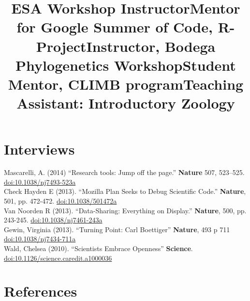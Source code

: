 \documentclass[margin]{res}
\begin{document}
\begin{resume}
\title{ESA Workshop Instructor}
\begin{position} \vspace{-.8cm} \end{position}
\title{Mentor for Google Summer of Code, R-Project}
\begin{position} \vspace{-.8cm} \end{position}
\title{Instructor, Bodega Phylogenetics Workshop}
\begin{position} \vspace{-.8cm} \end{position}
\title{Student Mentor, CLIMB program}
\begin{position} \vspace{-.8cm} \end{position}
\title{Teaching Assistant: Introductory Zoology}
 \begin{position} \vspace{-.0cm} \end{position}




\section{Interviews}

Mascarelli, A. (2014) ``Research tools: Jump off the page.'' \textbf{Nature} 507, 523–525. \href{http://doi.org/10.1038/nj7493-523a}{doi:10.1038/nj7493-523a} \\
Check Hayden E (2013). ``Mozilla Plan Seeks to Debug Scientific Code.'' \textbf{Nature}, 501, pp. 472-472. \href{http://doi.org/10.1038/501472a}{doi:10.1038/501472a} \\ 
Van Noorden R (2013). ``Data-Sharing: Everything on Display.'' \textbf{Nature}, 500, pp. 243-245. \href{http://doi.org/10.1038/nj7461-243a}{doi:10.1038/nj7461-243a} \\
Gewin, Virginia (2013). ``Turning Point: Carl Boettiger'' \textbf{Nature}, 493 p 711 \href{http://doi.org/10.1038/nj7434-711a}{doi:10.1038/nj7434-711a} \\
Wald, Chelsea (2010). ``Scientists Embrace Openness'' \textbf{Science}. \href{http://doi.org/10.1126/science.caredit.a1000036}{doi:10.1126/science.caredit.a1000036} 

\section{References}


\end{resume}
\end{document}
